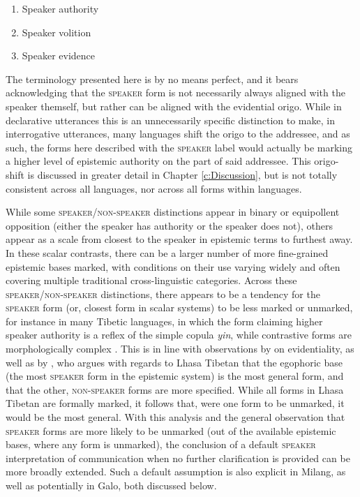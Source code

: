\begin{enumerate}
        \item Speaker authority
        \item Speaker volition
        \item Speaker evidence
\end{enumerate} 

The terminology presented here is by no means perfect, and it bears acknowledging that the \textsc{speaker} form is not necessarily always aligned with the speaker themself, but rather can be aligned with the evidential origo. While in declarative utterances this is an unnecessarily specific distinction to make, in interrogative utterances, many languages shift the origo to the addressee, and as such, the forms here described with the \textsc{speaker} label would actually be marking a higher level of epistemic authority on the part of said addressee. This origo-shift is discussed in greater detail in Chapter \ref{c:Discussion}, but is not totally consistent across all languages, nor across all forms within languages. 

While some \textsc{speaker}/\textsc{non-speaker} distinctions appear in binary or equipollent opposition (either the speaker has authority or the speaker does not), others appear as a scale from closest to the speaker in epistemic terms to furthest away. In these scalar contrasts, there can be a larger number of more fine-grained epistemic bases marked, with conditions on their use varying widely and often covering multiple traditional cross-linguistic categories. Across these \textsc{speaker}/\textsc{non-speaker} distinctions, there appears to be a tendency for the \textsc{speaker} form (or, closest form in scalar systems) to be less marked or unmarked, for instance in many Tibetic languages, in which the form claiming higher speaker authority is a reflex of the simple copula \textit{yin}, while contrastive forms are morphologically complex \cites{Bodnaruk2023a}{Zemp2021a}. This is in line with observations by  on evidentiality, as well as by , who argues with regards to Lhasa Tibetan that the egophoric base (the most \textsc{speaker} form in the epistemic system) is the most general form, and that the other, \textsc{non-speaker} forms are more specified. While all forms in Lhasa Tibetan are formally marked, it follows that, were one form to be unmarked, it would be the most general. With this analysis and the general observation that \textsc{speaker} forms are more likely to be unmarked (out of the available epistemic bases, where any form is unmarked), the conclusion of a default \textsc{speaker} interpretation of communication when no further clarification is provided can be more broadly extended. Such a default assumption is also explicit in Milang, as well as potentially in Galo, both discussed below.

